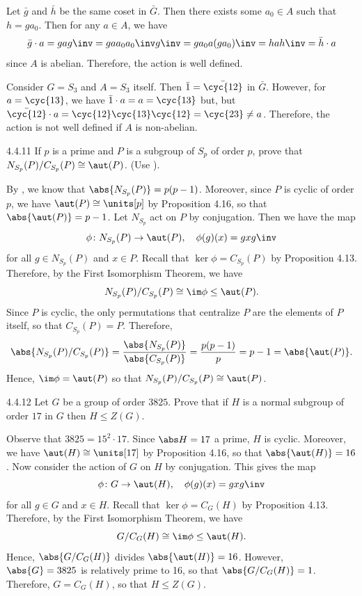 \begin{sol}
	Let $\bar g$ and $\bar h$ be the same coset in $\bar G$.
	Then there exists some $a_0 \in A$ such that $h = ga_0$.
	Then for any $a \in A$, we have
	\[
		\bar g \cdot a = gag\inv = ga a_0a_0\inv g\inv = ga_0a(ga_0)\inv = hah\inv = \bar h \cdot a
	\]
	since $A$ is abelian.
	Therefore, the action is well defined.

	Consider $G = S_3$ and $A = S_3$ itself.
	Then $\bar 1 = \bar{\cyc{1 2}}$ in $\bar G$.
	However, for $a = \cyc{1 3}$, we have $\bar 1 \cdot a = a = \cyc{1 3}$ but, but $\bar{\cyc{1 2}} \cdot a = \cyc{1 2}\cyc{1 3}\cyc{1 2} = \cyc{2 3} \neq a$.
	Therefore, the action is not well defined if $A$ is non-abelian.
\end{sol}

\begin{exercise}{4.4.11}
	If $p$ is a prime and $P$ is a subgroup of $S_p$ of order $p$, prove that $N_{S_p}(P)/C_{S_p}(P) \cong \aut(P)$. (Use ).
\end{exercise}

\begin{sol}
	By , we know that $\abs{N_{S_p}(P)} = p(p - 1)$.
	Moreover, since $P$ is cyclic of order $p$, we have $\aut(P) \cong \units[p]$ by Proposition 4.16, so that $\abs{\aut(P)} = p - 1$.
	Let $N_{S_p}$ act on $P$ by conjugation.
	Then we have the map
	\[
		\phi \colon N_{S_p}(P) \to \aut(P), \quad \phi(g)(x) = gxg\inv
	\]
	for all $g \in N_{S_p}(P)$ and $x \in P$.
	Recall that $\ker\phi = C_{S_p}(P)$ by Proposition 4.13.
	Therefore, by the First Isomorphism Theorem, we have
	\[
		N_{S_p}(P)/C_{S_p}(P) \cong \im\phi \leq \aut(P).
	\]
	Since $P$ is cyclic, the only permutations that centralize $P$ are the elements of $P$ itself, so that $C_{S_p}(P) = P$.
	Therefore,
	\[
		\abs{N_{S_p}(P)/C_{S_p}(P)} = \frac{\abs{N_{S_p}(P)}}{\abs{C_{S_p}(P)}} = \frac{p(p - 1)}{p} = p - 1 = \abs{\aut(P)}.
	\]
	Hence, $\im\phi = \aut(P)$ so that $N_{S_p}(P)/C_{S_p}(P) \cong \aut(P)$.
\end{sol}

\begin{exercise}{4.4.12}
	Let $G$ be a group of order $3825$.
	Prove that if $H$ is a normal subgroup of order $17$ in $G$ then $H \leq Z(G)$.
\end{exercise}

\begin{sol}
	Observe that $3825 = 15^2 \cdot 17$.
	Since $\abs H = 17$ a prime, $H$ is cyclic.
	Moreover, we have $\aut(H) \cong \units[17]$ by Proposition 4.16, so that $\abs{\aut(H)} = 16$.
	Now consider the action of $G$ on $H$ by conjugation.
	This gives the map
	\[
		\phi \colon G \to \aut(H), \quad \phi(g)(x) = gxg\inv
	\]
	for all $g \in G$ and $x \in H$.
	Recall that $\ker\phi = C_G(H)$ by Proposition 4.13.
	Therefore, by the First Isomorphism Theorem, we have
	\[
		G/C_G(H) \cong \im\phi \leq \aut(H).
	\]
	Hence, $\abs{G/C_G(H)}$ divides $\abs{\aut(H)} = 16$.
	However, $\abs{G} = 3825$ is relatively prime to 16, so that $\abs{G/C_G(H)} = 1$.
	Therefore, $G = C_G(H)$, so that $H \leq Z(G)$.
\end{sol}

